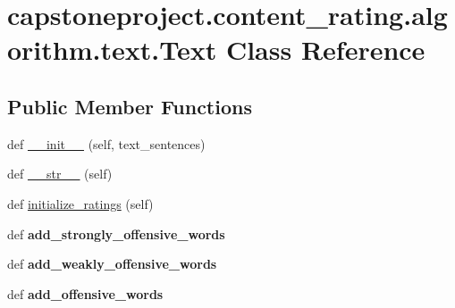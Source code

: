 \hypertarget{classcapstoneproject_1_1content__rating_1_1algorithm_1_1text_1_1_text}{}\section{capstoneproject.\+content\+\_\+rating.\+algorithm.\+text.\+Text Class Reference}
\label{classcapstoneproject_1_1content__rating_1_1algorithm_1_1text_1_1_text}
\subsection*{Public Member Functions}
\begin{DoxyCompactItemize}
\item 
def \mbox{\hyperlink{classcapstoneproject_1_1content__rating_1_1algorithm_1_1text_1_1_text_a374637e3217ae70047dad0c95261d17a}{\+\_\+\+\_\+init\+\_\+\+\_\+}} (self, text\+\_\+sentences)
\item 
def \mbox{\hyperlink{classcapstoneproject_1_1content__rating_1_1algorithm_1_1text_1_1_text_a92e45e772ffcc9b5dd96c5607295d4f0}{\+\_\+\+\_\+str\+\_\+\+\_\+}} (self)
\item 
def \mbox{\hyperlink{classcapstoneproject_1_1content__rating_1_1algorithm_1_1text_1_1_text_a4aa37be04d1e2098ddc3d44a2f9adb91}{initialize\+\_\+ratings}} (self)
\item 
\mbox{\label{classcapstoneproject_1_1content__rating_1_1algorithm_1_1text_1_1_text_abc766473fecca86562981e6514ef170e}} 
def {\bfseries add\+\_\+strongly\+\_\+offensive\+\_\+words}
\item 
\mbox{\label{classcapstoneproject_1_1content__rating_1_1algorithm_1_1text_1_1_text_a5feed10ef309ca316ab877c1246649b4}} 
def {\bfseries add\+\_\+weakly\+\_\+offensive\+\_\+words}
\item 
\mbox{\label{classcapstoneproject_1_1content__rating_1_1algorithm_1_1text_1_1_text_a66215823c19db88ae7b3cd58c9e25a5c}} 
def {\bfseries add\+\_\+offensive\+\_\+words}
\item 
\mbox{\label{classcapstoneproject_1_1content__rating_1_1algorithm_1_1text_1_1_text_a1fcde5fbe61f5100b92f30028d037b3c}} 

\end{DoxyCompactItemize}
